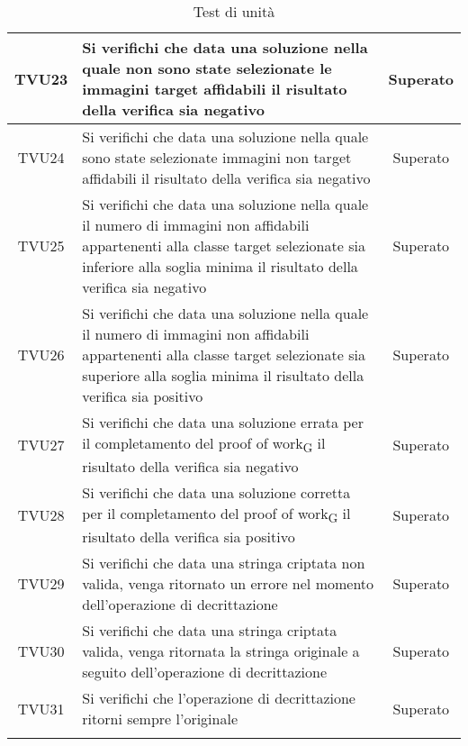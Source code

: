 \begin{center}
\begin{xltabular}{\textwidth}{|c|X|c|}
		TVU23 & Si verifichi che data una soluzione nella quale non sono state selezionate le immagini target affidabili il risultato della verifica sia negativo  & Superato\\
		\hline
		TVU24 & Si verifichi che data una soluzione nella quale sono state selezionate immagini non target affidabili il risultato della verifica sia negativo & Superato\\
		\hline
		TVU25 & Si verifichi che data una soluzione nella quale il numero di immagini non affidabili appartenenti alla classe target selezionate sia inferiore alla soglia minima il risultato della verifica sia negativo & Superato\\
		\hline
		TVU26 & Si verifichi che data una soluzione nella quale il numero di immagini non affidabili appartenenti alla classe target selezionate sia superiore alla soglia minima il risultato della verifica sia positivo & Superato\\
		\hline
		TVU27 & Si verifichi che data una soluzione errata per il completamento del proof of work\textsubscript{G} il risultato della verifica sia negativo & Superato\\
		\hline
		TVU28 & Si verifichi che data una soluzione corretta per il completamento del proof of work\textsubscript{G} il risultato della verifica sia positivo & Superato\\
		\hline
		TVU29 & Si verifichi che data una stringa criptata non valida, venga ritornato un errore nel momento dell'operazione di decrittazione & Superato\\
		\hline
		TVU30 & Si verifichi che data una stringa criptata valida, venga ritornata la stringa originale a seguito dell'operazione di decrittazione & Superato\\
		\hline
		TVU31 & Si verifichi che l'operazione di decrittazione ritorni sempre l'originale & Superato\\
		\hline
		\caption{Test di unità}
	\end{xltabular}
\end{center}


